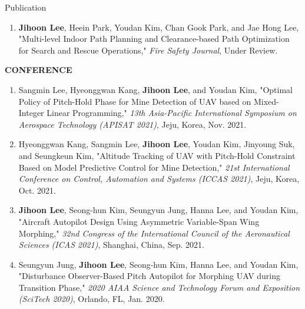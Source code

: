 \documentclass{resume}
\begin{document}
\begin{rSection}{Publication}
\begin{enumerate}
		\item \color{gray} \textbf{Jihoon Lee}, Heein Park, Youdan Kim, Chan Gook Park, and Jae Hong Lee, "Multi-level Indoor Path Planning and Clearance-based Path Optimization for Search and Rescue Operations," \textit{Fire Safety Journal}, Under Review. \color{black}

	\end{enumerate}\renewcommand{\labelenumi}{\theenumi.}
	
	\textbf{CONFERENCE}
	\begin{enumerate}\renewcommand{\labelenumi}{[C\theenumi]}
		
		\item Sangmin Lee, Hyeonggwan Kang, \textbf{Jihoon Lee}, and Youdan Kim, "Optimal Policy of Pitch-Hold Phase for Mine Detection of UAV based on Mixed-Integer Linear Programming," \textit{13th Asia-Pacific International Symposium on Aerospace Technology (APISAT 2021)}, Jeju, Korea, Nov. 2021. 
				
		\item Hyeonggwan Kang, Sangmin Lee, \textbf{Jihoon Lee}, Youdan Kim, Jinyoung Suk, and Seungkeun Kim, "Altitude Tracking of UAV with Pitch-Hold Constraint Based on Model Predictive Control for Mine Detection," \textit{21st International Conference on Control, Automation and Systems (ICCAS 2021)}, Jeju, Korea, Oct. 2021. 
		
		\item \textbf{Jihoon Lee}, Seong-hun Kim, Seungyun Jung, Hanna Lee, and Youdan Kim, "Aircraft Autopilot Design Using Asymmetric Variable-Span Wing Morphing," \textit{32nd Congress of the International Council of the Aeronautical Sciences (ICAS 2021)}, Shanghai, China, Sep. 2021. 
		
		\item Seungyun Jung, \textbf{Jihoon Lee}, Seong-hun Kim, Hanna Lee, and Youdan Kim, "Disturbance Observer-Based Pitch Autopilot for Morphing UAV during Transition Phase," \textit{2020 AIAA Science and Technology Forum and Exposition (SciTech 2020)}, Orlando, FL, Jan. 2020. 
		

\end{enumerate}
\end{rSection}
\end{document}
